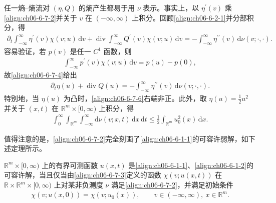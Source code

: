 \documentclass[../../main.tex]{subfiles}
\begin{document}
任一熵--熵流对 $(\eta,Q)$ 的熵产生都易于用 $\nu$ 表示。事实上，以 $\eta^{\prime}(v)$ 乘\eqref{align:ch06-6-7-2}并关于 $v$ 在 $(-\infty,\infty)$ 上积分。回顾\eqref{align:ch06-6-2-1}并分部积分，得
\begin{align}
\partial_{t}\int_{-\infty}^{\infty}\eta^{\prime}(v)\chi(v;u)\,\mathrm{d}v+\operatorname{div}\int_{-\infty}^{\infty}Q^{\prime}(v)\chi(v;u)\,\mathrm{d}v=-\int_{-\infty}^{\infty}\eta^{\prime\prime}(v)\,\mathrm{d}\nu(v;\cdot,\cdot).
\label{align:ch06-6-7-4}
\end{align}
容易验证，若 $p(v)$ 是任一 $C^{1}$ 函数，则
\begin{align}
\int_{-\infty}^{\infty}p^{\prime}(v)\chi(v;u)\,\mathrm{d}v=p(u)-p(0),
\label{align:ch06-6-7-5}
\end{align}
故\eqref{align:ch06-6-7-4}给出
\begin{align}
\partial_{t}\eta(u)+\operatorname{div}Q(u)=-\int_{-\infty}^{\infty}\eta^{\prime\prime}(v)\,\mathrm{d}\nu(v;\cdot,\cdot).
\label{align:ch06-6-7-6}
\end{align}
特别地，当 $\eta(u)$ 为凸时，\eqref{align:ch06-6-7-6}右端非正。此外，取 $\eta(u)=\tfrac{1}{2}u^{2}$ 并关于 $(x,t)$ 在 $\mathbb{R}^{m}\times[0,\infty)$ 上积分，得
\begin{align}
\int_{0}^{\infty}\int_{\mathbb{R}^{m}}\int_{-\infty}^{\infty}\mathrm{d}\nu(v;x,t)\,\mathrm{d}x\,\mathrm{d}t\leqslant\frac{1}{2}\int_{\mathbb{R}^{m}}u_{0}^{2}(x)\,\mathrm{d}x.
\label{align:ch06-6-7-7}
\end{align}

值得注意的是，\eqref{align:ch06-6-7-2}完全刻画了\eqref{align:ch06-6-1-1}的可容许弱解，如下述定理所示。

\begin{theorem}\label{theorem:ch06-6-7-1}
$\mathbb{R}^{m}\times[0,\infty)$ 上的有界可测函数 $u(x,t)$ 是\eqref{align:ch06-6-1-1}、\eqref{align:ch06-6-1-2}的可容许解，当且仅当由\eqref{align:ch06-6-7-3}定义的函数 $\chi(v;u(x,t))$ 在 $\mathbb{R}\times\mathbb{R}^{m}\times[0,\infty)$ 上对某非负测度 $\nu$ 满足\eqref{align:ch06-6-7-2}，并满足初始条件
\begin{align}
\chi(v;u(x,0))=\chi(v;u_{0}(x)),\qquad v\in(-\infty,\infty),\ x\in\mathbb{R}^{m}.
\label{align:ch06-6-7-8}
\end{align}
\end{theorem}
\end{document}
